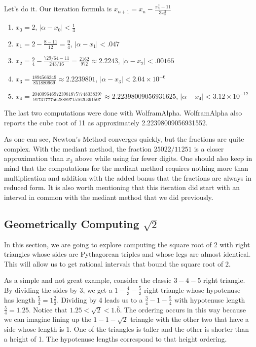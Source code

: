 \documentclass[12pt]{article}
\begin{document}
Let's do it. Our iteration formula is $x_{n+1} = x_n - \frac{x_n^3 -11}{3 x_n^2}$ 
\begin{enumerate}
\item $x_0 = 2$, $|\alpha - x_0| < \frac{1}{4}$
\item $x_1 = 2 - \frac{8- 11}{12} = \frac{9}{4}$, $|\alpha - x_1| < .047$
\item $x_2 = \frac{9}{4} - \frac{ 729/64 - 11 }{243/16} = \frac{2162}{972}\approx 2.2243 $, $|\alpha - x_2| < .00165$
\item $x_3 = \frac{1894566349}{851880969} \approx 2.2239801 $, $|\alpha - x_3| < 2.04\times 10^{-6}$
\item $x_4 = \frac{20400964697239818757748038397}{9173177756288897151620391507} \approx 2.22398009056931625 $, $|\alpha - x_4| < 3.12 \times 10^{-12}$
\end{enumerate}


The last two computations were done with WolframAlpha.  WolframAlpha also reports the cube root of 11 as approximately 2.22398009056931552. 

As one can see, Newton's Method converges quickly, but the fractions are quite complex. With the mediant method, the fraction $25022/11251$ is a closer approximation than $x_3$ above while using far fewer digits. One should also keep in mind that the computations for the mediant method requires nothing more than multiplication and addition with the added bonus that the fractions are always in reduced form. It is also worth mentioning that this iteration did start with an interval in common with the mediant method that we did previously. 

\subsection{Geometrically Computing \texorpdfstring{$\sqrt{2}$}{sqrt2}}

In this section, we are going to explore computing the square root of 2 with right triangles whose sides are Pythagorean triples and whose legs are almost identical. This will allow us to get rational intervals that bound the square root of 2. 

As a simple and not great example, consider the classic $3-4-5$ right triangle. By dividing the sides by 3, we get a $1-\frac{4}{3}-\frac{5}{3}$ right triangle whose hypotenuse has length $\frac{5}{3} = 1 \frac{2}{3}$. Dividing by 4 leads us to a $\frac{3}{4}-1-\frac{5}{4}$ with hypotenuse  length $\frac{5}{4} = 1.25$. Notice that $1.25 < \sqrt{2} < 1.\bar{6}$.  The ordering occurs in this way because we can imagine lining up the $1-1-\sqrt{2}$ triangle with the other two that have a side whose length is 1. One of the triangles is taller and the other is shorter than a height of 1. The hypotenuse lengths correspond to that height ordering. 
\end{document}
